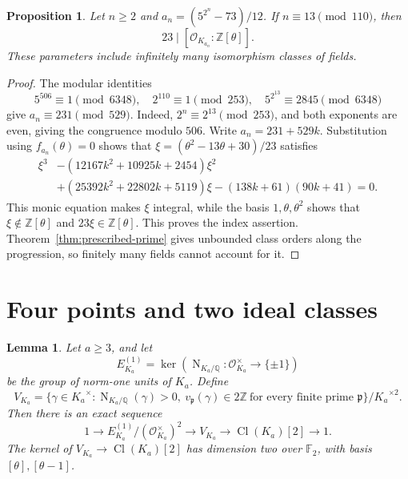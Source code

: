 \documentclass[11pt,leqno,oneside,letterpaper]{amsart}
\newtheorem{proposition}[theorem]{Proposition}
\newtheorem{lemma}[theorem]{Lemma}
\theoremstyle{remark}
\numberwithin{equation}{section}
\newcommand{\Q}{\mathbb Q}
\newcommand{\Z}{\mathbb Z}
\newcommand{\F}{\mathbb F}
\DeclareMathOperator{\Cl}{Cl}
\DeclareMathOperator{\Nm}{N}
\begin{document}
\begin{proposition}\label{prop:nonmaximal}
  Let $n\geq2$ and $a_n=(5^{2^n}-73)/12$. If $n\equiv13\pmod{110}$, then
  \[
    23\mid[\mathcal O_{K_{a_n}}:\Z[\theta]].
  \]
  These parameters include infinitely many isomorphism classes of fields.
\end{proposition}

\begin{proof}
  The modular identities
  \[
    5^{506}\equiv1\pmod{6348},\quad
    2^{110}\equiv1\pmod{253},\quad
    5^{2^{13}}\equiv2845\pmod{6348}
  \]
  give $a_n\equiv231\pmod{529}$. Indeed, $2^n\equiv2^{13}\pmod{253}$, and both exponents are even, giving the congruence modulo $506$. Write $a_n=231+529k$. Substitution using $f_{a_n}(\theta)=0$ shows that $\xi=(\theta^2-13\theta+30)/23$ satisfies
  \begin{align*}
    \xi^3 & -(12167k^2+10925k+2454)\xi^2                    \\
          & +(25392k^2+22802k+5119)\xi-(138k+61)(90k+41)=0.
  \end{align*}
  This monic equation makes $\xi$ integral, while the basis $1,\theta,\theta^2$ shows that $\xi\notin\Z[\theta]$ and $23\xi\in\Z[\theta]$. This proves the index assertion. Theorem~\ref{thm:prescribed-prime} gives unbounded class orders along the progression, so finitely many fields cannot account for it.
\end{proof}

\section{Four points and two ideal classes}

\begin{lemma}\label{lem:virtual-units}
  Let $a\geq3$, and let
  \[
    E_{K_{a}}^{(1)}=\ker(\Nm_{{K_{a}}/\Q}:\mathcal O_{K_{a}}^\times\to\{\pm1\})
  \]
  be the group of norm-one units of $K_a$. Define
  \[
    V_{K_{a}}=\{\gamma\in {K_{a}}^\times:\Nm_{{K_{a}}/\Q}(\gamma)>0,\ v_{\mathfrak p}(\gamma)\in2\Z\ \text{for every finite prime }\mathfrak p\}/{K_{a}}^{\times2}.
  \]
  Then there is an exact sequence
  \[
    1\longrightarrow E_{K_{a}}^{(1)}/(\mathcal O_{K_{a}}^\times)^2
    \longrightarrow V_{K_{a}}\longrightarrow\Cl({K_{a}})[2]\longrightarrow1.
  \]
  The kernel of $V_{K_{a}}\to\Cl({K_{a}})[2]$ has dimension two over $\F_2$, with basis $[\theta],[\theta-1]$.
\end{lemma}
\end{document}

